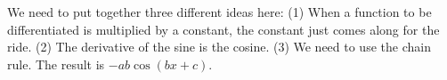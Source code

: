 We need to put together three different ideas here: (1) When a function to be
differentiated is multiplied by a constant, the constant just comes along for the ride.                                        
(2) The derivative of the sine is the cosine. (3) We need to use the chain rule.
The result is $-ab\cos(bx+c)$.
